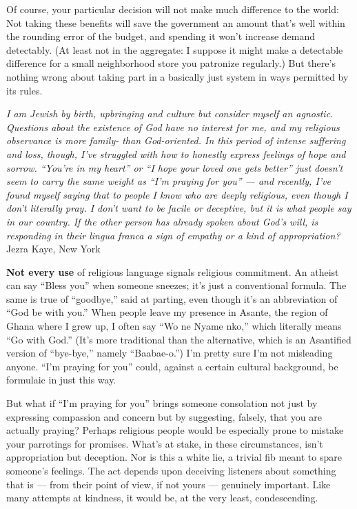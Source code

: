 Of course, your particular decision will not make much difference to the
world: Not taking these benefits will save the government an amount
that's well within the rounding error of the budget, and spending it
won't increase demand detectably. (At least not in the aggregate: I
suppose it might make a detectable difference for a small neighborhood
store you patronize regularly.) But there's nothing wrong about taking
part in a basically just system in ways permitted by its rules.

\emph{I am Jewish by birth, upbringing and culture but consider myself
an agnostic. Questions about the existence of God have no interest for
me, and my religious observance is more family- than God-oriented. In
this period of intense suffering and loss, though, I've struggled with
how to honestly express feelings of hope and sorrow. ``You're in my
heart'' or ``I hope your loved one gets better'' just doesn't seem to
carry the same weight as ``I'm praying for you'' --- and recently, I've
found myself saying that to people I know who are deeply religious, even
though I don't literally pray. I don't want to be facile or deceptive,
but it is what people say in our country. If the other person has
already spoken about God's will, is responding in their lingua franca a
sign of empathy or a kind of appropriation?} Jezra Kaye, New York

\textbf{Not every use} of religious language signals religious
commitment. An atheist can say ``Bless you'' when someone sneezes; it's
just a conventional formula. The same is true of ``goodbye,'' said at
parting, even though it's an abbreviation of ``God be with you.'' When
people leave my presence in Asante, the region of Ghana where I grew up,
I often say ``Wo ne Nyame nko,'' which literally means ``Go with God.''
(It's more traditional than the alternative, which is an Asantified
version of ``bye-bye,'' namely ``Baabae-o.'') I'm pretty sure I'm not
misleading anyone. ``I'm praying for you'' could, against a certain
cultural background, be formulaic in just this way.

But what if ``I'm praying for you'' brings someone consolation not just
by expressing compassion and concern but by suggesting, falsely, that
you are actually praying? Perhaps religious people would be especially
prone to mistake your parrotings for promises. What's at stake, in these
circumstances, isn't appropriation but deception. Nor is this a white
lie, a trivial fib meant to spare someone's feelings. The act depends
upon deceiving listeners about something that is --- from their point of
view, if not yours --- genuinely important. Like many attempts at
kindness, it would be, at the very least, condescending.

